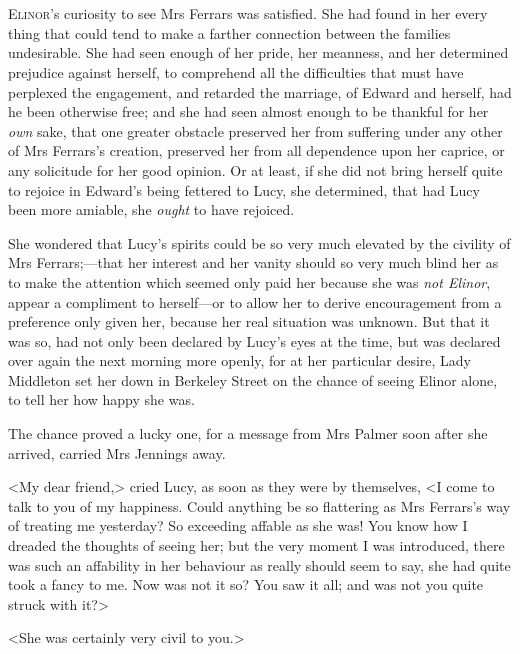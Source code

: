 \chapter[Chapter \thechapter]{}
\lettrine[lraise=0.3]{E}{linor}'s curiosity to see Mrs Ferrars was satisfied. She had found in her every thing that could tend to make a farther connection between the families undesirable. She had seen enough of her pride, her meanness, and her determined prejudice against herself, to comprehend all the difficulties that must have perplexed the engagement, and retarded the marriage, of Edward and herself, had he been otherwise free; and she had seen almost enough to be thankful for her \textit{own} sake, that one greater obstacle preserved her from suffering under any other of Mrs Ferrars's creation, preserved her from all dependence upon her caprice, or any solicitude for her good opinion. Or at least, if she did not bring herself quite to rejoice in Edward's being fettered to Lucy, she determined, that had Lucy been more amiable, she \textit{ought} to have rejoiced.

She wondered that Lucy's spirits could be so very much elevated by the civility of Mrs Ferrars;—that her interest and her vanity should so very much blind her as to make the attention which seemed only paid her because she was \textit{not Elinor}, appear a compliment to herself—or to allow her to derive encouragement from a preference only given her, because her real situation was unknown. But that it was so, had not only been declared by Lucy's eyes at the time, but was declared over again the next morning more openly, for at her particular desire, Lady Middleton set her down in Berkeley Street on the chance of seeing Elinor alone, to tell her how happy she was.

The chance proved a lucky one, for a message from Mrs Palmer soon after she arrived, carried Mrs Jennings away.

<My dear friend,> cried Lucy, as soon as they were by themselves, <I come to talk to you of my happiness. Could anything be so flattering as Mrs Ferrars's way of treating me yesterday? So exceeding affable as she was! You know how I dreaded the thoughts of seeing her; but the very moment I was introduced, there was such an affability in her behaviour as really should seem to say, she had quite took a fancy to me. Now was not it so? You saw it all; and was not you quite struck with it?>

<She was certainly very civil to you.>

